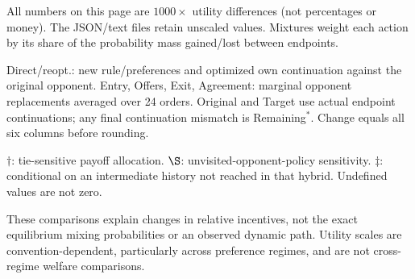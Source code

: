 \documentclass[10pt]{article}
\begin{document}
{\begin{longtable}{@{}>{\raggedright\arraybackslash}p{1.7in}rrrrrrrrrr@{}}
\end{longtable}} {\footnotesize All numbers on this page are $1000\times$ utility differences (not percentages or money). The JSON/text files retain unscaled values. Mixtures weight each action by its share of the probability mass gained/lost between endpoints.\par
Direct/reopt.: new rule/preferences and optimized own continuation against the original opponent. Entry, Offers, Exit, Agreement: marginal opponent replacements averaged over 24 orders. Original and Target use actual endpoint continuations; any final continuation mismatch is Remaining$^*$. Change equals all six columns before rounding.\par
$\dagger$: tie-sensitive payoff allocation. $\S$: unvisited-opponent-policy sensitivity. $\ddagger$: conditional on an intermediate history not reached in that hybrid. Undefined values are not zero.\par
These comparisons explain changes in relative incentives, not the exact equilibrium mixing probabilities or an observed dynamic path. Utility scales are convention-dependent, particularly across preference regimes, and are not cross-regime welfare comparisons.}\par
\end{document}
